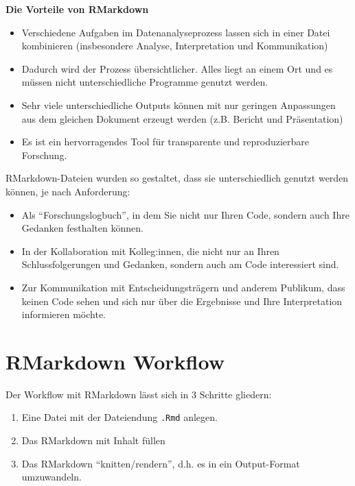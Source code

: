 \documentclass[
]{book}
\begin{document}
\leavevmode\hypertarget{info_spss}{}%
\textbf{Die Vorteile von RMarkdown}

\begin{itemize}
\item
  Verschiedene Aufgaben im Datenanalyseprozess lassen sich in einer Datei kombinieren (insbesondere Analyse, Interpretation und Kommunikation)
\item
  Dadurch wird der Prozess übersichtlicher. Alles liegt an einem Ort und es müssen nicht unterschiedliche Programme genutzt werden.
\item
  Sehr viele unterschiedliche Outputs können mit nur geringen Anpassungen aus dem gleichen Dokument erzeugt werden (z.B. Bericht und Präsentation)
\item
  Es ist ein hervorragendes Tool für transparente und reproduzierbare Forschung.
\end{itemize}

RMarkdown-Dateien wurden so gestaltet, dass sie unterschiedlich genutzt werden können, je nach Anforderung:

\begin{itemize}
\item
  Als ``Forschungslogbuch'', in dem Sie nicht nur Ihren Code, sondern auch Ihre Gedanken festhalten können.
\item
  In der Kollaboration mit Kolleg:innen, die nicht nur an Ihren Schlussfolgerungen und Gedanken, sondern auch am Code interessiert sind.
\item
  Zur Kommunikation mit Entscheidungsträgern und anderem Publikum, dass keinen Code sehen und sich nur über die Ergebnisse und Ihre Interpretation informieren möchte.
\end{itemize}

\hypertarget{rmarkdown-workflow}{%
\section{RMarkdown Workflow}\label{rmarkdown-workflow}}

Der Workflow mit RMarkdown lässt sich in 3 Schritte gliedern:

\begin{enumerate}
\def\labelenumi{\arabic{enumi}.}
\item
  Eine Datei mit der Dateiendung \texttt{.Rmd} anlegen.
\item
  Das RMarkdown mit Inhalt füllen
\item
  Das RMarkdown ``knitten/rendern'', d.h. es in ein Output-Format umzuwandeln.
\end{enumerate}
\end{document}
